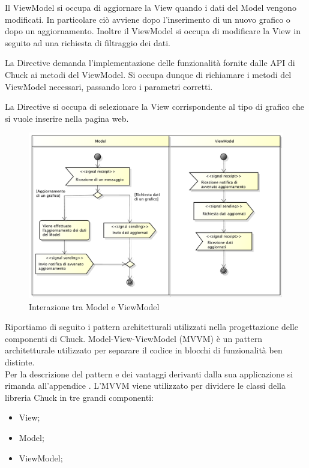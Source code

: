 			Il ViewModel si occupa di aggiornare la View quando i dati del Model vengono modificati. In particolare ciò avviene dopo l'inserimento di un nuovo grafico o dopo un aggiornamento. Inoltre il ViewModel si occupa di modificare la View in seguito ad una richiesta di filtraggio dei dati.
				
			La Directive demanda l'implementazione delle funzionalità fornite dalle API di Chuck ai metodi del ViewModel. Si occupa dunque di richiamare i metodi del ViewModel necessari, passando loro i parametri corretti.
			
			La Directive si occupa di selezionare la View corrispondente al tipo di grafico che si vuole inserire nella pagina web.
			\begin{figure}[H]\centering
	        		\includegraphics[width=\textwidth]{SpecificaTecnica/Pics/Model-ViewModel}
	        		\caption{Interazione tra Model e ViewModel}
	    		\end{figure}
	    		
		Riportiamo di seguito i pattern architetturali utilizzati nella progettazione delle componenti di Chuck.
			Model-View-ViewModel (MVVM) è un pattern architetturale utilizzato per separare il codice in blocchi di funzionalità ben distinte.\\
			Per la descrizione del pattern e dei vantaggi derivanti dalla sua applicazione si rimanda all'appendice .
				L'MVVM viene utilizzato per dividere le classi della libreria Chuck in tre grandi componenti:
				\begin{itemize}
					\item View;
					\item Model;
					\item ViewModel;
				\end{itemize}
	

